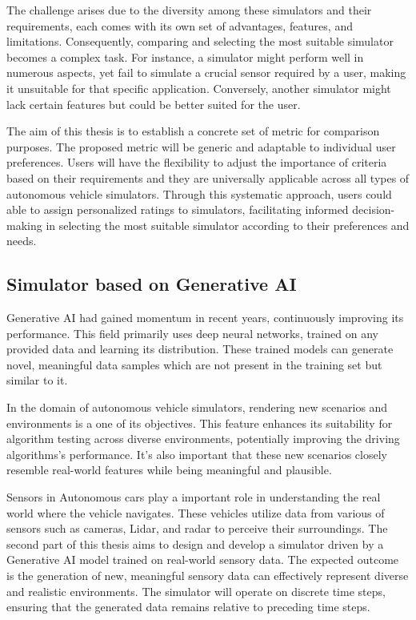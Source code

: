 \documentclass[12pt,twoside,a4paper,parskip]{scrbook} %
\begin{document}
The challenge arises due to the diversity among these simulators and their requirements, each comes with its own set of advantages, features, and limitations. Consequently, comparing and selecting the most suitable simulator becomes a complex task. For instance, a simulator might perform well in numerous aspects, yet fail to simulate a crucial sensor required by a user, making it unsuitable for that specific application. Conversely, another simulator might lack certain features but could be better suited for the user. 

The aim of this thesis is to establish a concrete set of metric for comparison purposes. The proposed metric will be generic and adaptable to individual user preferences. Users will have the flexibility to adjust the importance of criteria based on their requirements and they are universally applicable across all types of autonomous vehicle simulators. Through this systematic approach, users could able to assign personalized ratings to simulators, facilitating informed decision-making in selecting the most suitable simulator according to their preferences and needs.

\subsection{Simulator based on Generative AI}
Generative AI had gained momentum in recent years, continuously improving its performance. This field primarily uses deep neural networks, trained on any provided data and learning its distribution. These trained models can generate novel, meaningful data samples which are not present in the training set but similar to it. 

In the domain of autonomous vehicle simulators, rendering new scenarios and environments is a one of its objectives. This feature enhances its suitability for algorithm testing across diverse environments, potentially improving the driving algorithms’s performance. It’s also important that these new scenarios closely resemble real-world features while being meaningful and plausible.

Sensors in Autonomous cars play a important role in understanding the real world where the vehicle navigates. These vehicles utilize data from various of sensors such as cameras, Lidar, and radar to perceive their surroundings. The second part of this thesis aims to design and develop a simulator driven by a Generative AI model trained on real-world sensory data. The expected outcome is the generation of new, meaningful sensory data can effectively represent diverse and realistic environments. The simulator will operate on discrete time steps, ensuring that the generated data remains relative to preceding time steps.
\end{document}
